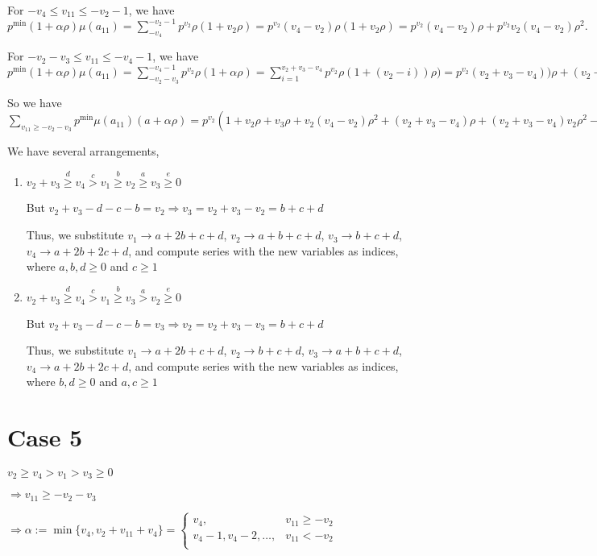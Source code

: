 \documentclass{article}
\begin{document}
For $-v_4\leq{v_{11}}\leq{-v_2-1}$, we have $p^{\min}(1+\alpha\rho)\mu(a_{11})=\sum_{-v_4}^{-v_2-1}p^{v_2}\rho(1+v_2\rho)=p^{v_2}(v_4-v_2)\rho(1+v_2\rho)=p^{v_2}(v_4-v_2)\rho+p^{v_2}v_2(v_4-v_2)\rho^2.$

For $-v_2-v_3\leq{v_{11}}\leq{-v_4-1}$, we have $p^{\min}(1+\alpha\rho)\mu(a_{11})=\sum_{-v_2-v_3}^{-v_4-1}p^{v_2}\rho(1+\alpha\rho)=\sum_{i=1}^{v_2+v_3-v_4}p^{v_2}\rho(1+(v_2-i))\rho)=p^{v_2}(v_2+v_3-v_4))\rho+(v_2+v_3-v_4)v_2\rho^2-\binom{v_2+v_3-v_4+1}{2}\rho^2.$

So we have $\sum_{v_{11}\geq{-v_2-v_3}}p^{\min}\mu(a_{11})(a+\alpha\rho)=p^{v_2}(1+v_2\rho+v_3\rho+v_2(v_4-v_2)\rho^2+(v_2+v_3-v_4)\rho+(v_2+v_3-v_4)v_2\rho^2-\frac{(v_2+v_3-v_4+1)(v_2+v_3-v_4)}{2}\rho^2).$

We have several arrangements,
\begin{enumerate}
\item 
$v_2+v_3\overset{d}{\geq}v_4\overset{c}{>}v_1\overset{b}{\geq}{v_2}\overset{a}{\geq}v_3\overset{e}{\geq}{0}$

But $v_2+v_3-d-c-b=v_2\Rightarrow{v_3=v_2+v_3-v_2=b+c+d}$

Thus, we substitute $v_1\rightarrow{a+2b+c+d}$, $v_2\rightarrow{a+b+c+d}$, $v_3\rightarrow{b+c+d}$, $v_4\rightarrow{a+2b+2c+d}$, and compute series with the new variables as indices, where $a,b,d\geq{0}$ and $c\geq{1}$
\item 
$v_2+v_3\overset{d}{\geq}v_4\overset{c}{>}v_1\overset{b}{\geq}{v_3}\overset{a}{>}v_2\overset{e}{\geq}{0}$

But $v_2+v_3-d-c-b=v_3\Rightarrow{v_2=v_2+v_3-v_3=b+c+d}$

Thus, we substitute $v_1\rightarrow{a+2b+c+d}$, $v_2\rightarrow{b+c+d}$, $v_3\rightarrow{a+b+c+d}$, $v_4\rightarrow{a+2b+2c+d}$, and compute series with the new variables as indices, where $b,d\geq{0}$ and $a,c\geq{1}$

\end{enumerate}
\section{Case 5}
$v_2\geq{v_4}>v_1>v_3\geq{0}$

$\Rightarrow{v_{11}}\geq{-v_2-v_3}$

$\Rightarrow\alpha:=\min\{v_4,v_2+v_{11}+v_4\}=\begin{cases}
       v_4, & v_{11}\geq{-v_2}\\
       v_4-1,v_4-2,\dots, & v_{11}<{-v_2}\\
     \end{cases}$
\end{document}
